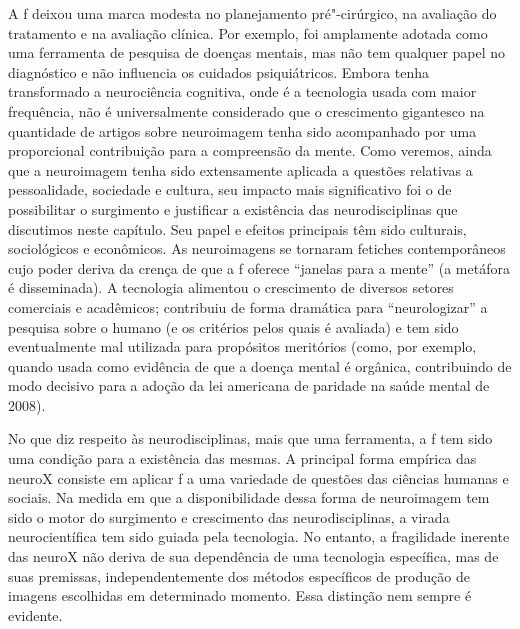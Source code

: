 A f deixou uma marca modesta no planejamento pré"-cirúrgico, na
avaliação do tratamento e na avaliação clínica. Por exemplo, foi
amplamente adotada como uma ferramenta de pesquisa de doenças mentais,
mas não tem qualquer papel no diagnóstico e não influencia os cuidados
psiquiátricos. Embora tenha transformado a neurociência cognitiva, onde
é a tecnologia usada com maior frequência, não é universalmente
considerado que o crescimento gigantesco na quantidade de artigos sobre
neuroimagem tenha sido acompanhado por uma proporcional contribuição
para a compreensão da mente. Como veremos, ainda que a neuroimagem tenha
sido extensamente aplicada a questões relativas a pessoalidade,
sociedade e cultura, seu impacto mais significativo foi o de
possibilitar o surgimento e justificar a existência das neurodisciplinas
que discutimos neste capítulo. Seu papel e efeitos principais têm sido
culturais, sociológicos e econômicos. As neuroimagens se tornaram
fetiches contemporâneos cujo poder deriva da crença de que a f
oferece ``janelas para a mente'' (a metáfora é disseminada). A
tecnologia alimentou o crescimento de diversos setores comerciais e
acadêmicos; contribuiu de forma dramática para ``neurologizar'' a
pesquisa sobre o humano (e os critérios pelos quais é avaliada) e tem
sido eventualmente mal utilizada para propósitos meritórios (como, por
exemplo, quando usada como evidência de que a doença mental é orgânica,
contribuindo de modo decisivo para a adoção da lei americana de paridade
na saúde mental de 2008).

No que diz respeito às neurodisciplinas, mais que uma ferramenta, a f
tem sido uma condição para a existência das mesmas. A principal forma
empírica das neuroX consiste em aplicar f a uma variedade de questões
das ciências humanas e sociais. Na medida em que a disponibilidade dessa
forma de neuroimagem tem sido o motor do surgimento e crescimento das
neurodisciplinas, a virada neurocientífica tem sido guiada pela
tecnologia. No entanto, a fragilidade inerente das neuroX não deriva de
sua dependência de uma tecnologia específica, mas de suas premissas,
independentemente dos métodos específicos de produção de imagens
escolhidas em determinado momento. Essa distinção nem sempre é evidente.

